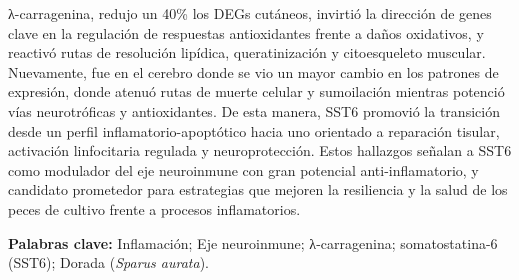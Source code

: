 \documentclass[10pt,a4paper]{article}
\begin{document}
λ-carragenina, redujo un 40\% los DEGs cutáneos, invirtió la dirección de genes clave en la regulación de respuestas antioxidantes frente a daños oxidativos, y reactivó rutas de resolución lipídica, queratinización y citoesqueleto muscular. Nuevamente, fue en el cerebro donde se vio un mayor cambio en los patrones de expresión, donde atenuó rutas de muerte celular y sumoilación mientras potenció vías neurotróficas y antioxidantes. De esta manera, SST6 promovió la transición desde un perfil inflamatorio-apoptótico hacia uno orientado a reparación tisular, activación linfocitaria regulada y neuroprotección. Estos hallazgos señalan a SST6 como modulador del eje neuroinmune con gran potencial anti-inflamatorio, y candidato prometedor para estrategias que mejoren la resiliencia y la salud de los peces de cultivo frente a procesos inflamatorios.

\vspace{1em}
\noindent\textbf{Palabras clave:} Inflamación; Eje neuroinmune; λ-carragenina; somatostatina-6 (SST6); Dorada (\textit{Sparus aurata}).

\newpage

\end{document}
